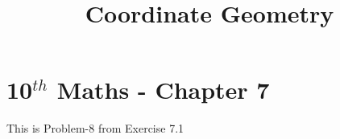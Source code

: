 \documentclass[12pt]{article}
\begin{document}
\begin{center}
\title{\textbf{Coordinate Geometry}}
\date{\vspace{-5ex}} %
\maketitle
\end{center}

\setcounter{page}{1}



\section*{10$^{th}$ Maths - Chapter 7}

This is Problem-8 from Exercise 7.1
\end{document}
